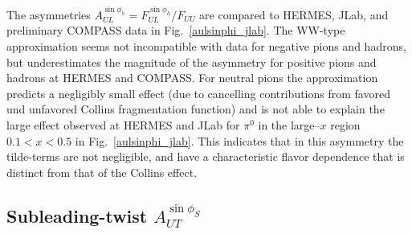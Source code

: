 \documentclass[a4paper,11pt]{article}
\begin{document}
The asymmetries $A_{UL}^{\sin\phi_h}=F_{UL}^{\sin\phi_h}/F_{UU}$ are compared
to HERMES, JLab, and preliminary COMPASS data in Fig.~\ref{aulsinphi_jlab}.
The WW-type approximation seems not incompatible with data for negative
pions and hadrons, but underestimates the magnitude of the asymmetry for
positive pions and hadrons at HERMES and COMPASS. For neutral pions the
approximation predicts a negligibly small effect (due to cancelling
contributions from favored und unfavored Collins fragmentation function)
and is not able to explain the large effect
observed at HERMES and JLab for $\pi^0$ in the large--$x$ region
$0.1< x < 0.5$ in Fig.~\ref{aulsinphi_jlab}.
This indicates that in this asymmetry the
tilde-terms are not negligible, and have a characteristic flavor
dependence that is distinct from that of the Collins effect.



\subsection{\boldmath Subleading-twist  $A_{UT}^{\sin\phi_S}$}
\label{Sec-7.6:FUTsinphiS}
\end{document}
